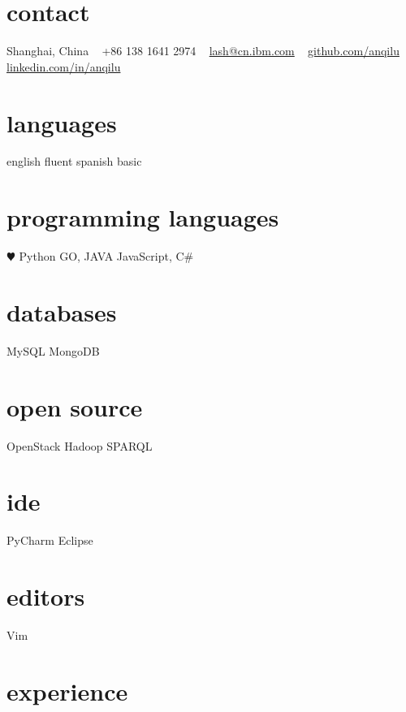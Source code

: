 \documentclass[]{friggeri-cv} %
\begin{document}


\begin{aside} %
\section{contact}
Shanghai, China
~
+86 138 1641 2974
~
\href{mailto:lash@cn.ibm.com}{lash@cn.ibm.com}
~
\href{https://github.com/anqilu}{github.com/anqilu}
\href{https://www.linkedin.com/in/anqilu}{linkedin.com/in/anqilu}
\section{languages}
english fluent
spanish basic
\section{programming languages}
{\color{red} $\varheartsuit$} Python
GO, JAVA
JavaScript, C\#
\section{databases}
MySQL
MongoDB
\section{open source}
OpenStack
Hadoop
SPARQL
\section{ide}
PyCharm
Eclipse
\section{editors}
Vim
\end{aside}

\section{experience}
\end{document}
